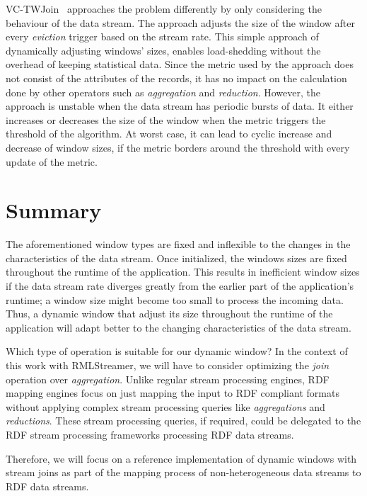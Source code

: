 VC-TWJoin~\cite{vctw_join} approaches the problem differently by only considering 
the behaviour of the data stream. The approach adjusts the size of the window 
after every \emph{eviction} trigger based on the stream rate. This simple approach 
of dynamically adjusting windows' sizes, enables load-shedding without the overhead of 
keeping statistical data. Since the metric used by the approach does not consist 
of the attributes of the records, it has no impact on the calculation 
done by other operators such as \emph{aggregation} and \emph{reduction}.
However, the approach is unstable when the data stream has periodic bursts of data.
It either increases or decreases the size of the window when the metric triggers 
the threshold of the algorithm. At worst case, it can lead to cyclic increase and 
decrease of window sizes, if the metric borders around the threshold with every 
update of the metric.


\section{Summary}%
\label{sec:Summary}

The aforementioned window types are fixed and inflexible to the changes 
in the characteristics of the data stream. Once initialized, the windows sizes 
are fixed throughout the runtime of the application. This results in inefficient 
window sizes if the data stream rate diverges greatly from the earlier part of the 
application's runtime; a window size might become too small to process the incoming 
data. Thus, a dynamic window that adjust its size throughout the runtime of the application 
will adapt better to the changing characteristics of the data stream. 


Which type of operation is suitable for our dynamic window? 
In the context of this work with RMLStreamer, we will have to consider optimizing the 
\emph{join} operation over \emph{aggregation}. 
Unlike regular stream processing engines, RDF mapping engines focus 
on just mapping the input to RDF compliant formats without 
applying complex stream processing queries like \emph{aggregations} and 
\emph{reductions}. These stream processing queries, if required, could be 
delegated to the RDF stream processing frameworks processing RDF data streams.

Therefore, we will focus on a reference implementation of dynamic windows with 
stream joins as part of the mapping process of non-heterogeneous data streams 
to RDF data streams. 



